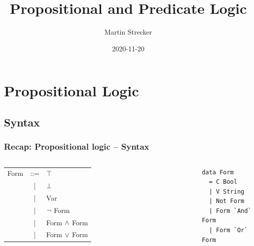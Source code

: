 \documentclass{beamer}
\title{Propositional and Predicate Logic}
\author{Martin Strecker}
\date{2020-11-20}
\begin{document}

\begin{frame}
  \titlepage
\end{frame}



\section{Propositional Logic}

\subsection{Syntax}

\begin{frame}[fragile]\frametitle{Recap: Propositional logic -- Syntax}


  \begin{columns}[t]

    \vspace{3mm}
  \begin{tabular}{rcl}
    Form  & ::=  & $\top$ \\
          & | &  $\perp$ \\
          & | &  Var\\
          & | &  $\neg$ Form \\
          & | &  Form $\wedge$ Form \\
          & | &  Form $\vee$ Form \\
  \end{tabular}

\begin{lstlisting}
data Form
  = C Bool
  | V String
  | Not Form
  | Form `And` Form
  | Form `Or` Form
\end{lstlisting}
\end{columns}  

\end{frame}
\end{document}
